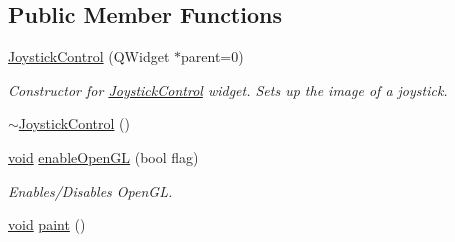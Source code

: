 \subsection*{Public Member Functions}
\begin{DoxyCompactItemize}
\item 
\hyperlink{group___g_c_s_control_gadget_plugin_ga77373f65ad7f3da249f63ebd5d64a736}{Joystick\-Control} (Q\-Widget $\ast$parent=0)
\begin{DoxyCompactList}\small\item\em Constructor for \hyperlink{class_joystick_control}{Joystick\-Control} widget. Sets up the image of a joystick. \end{DoxyCompactList}\item 
\hyperlink{group___g_c_s_control_gadget_plugin_gafb2a1d3ac608e7378bba52d774b825d0}{$\sim$\-Joystick\-Control} ()
\item 
\hyperlink{group___u_a_v_objects_plugin_ga444cf2ff3f0ecbe028adce838d373f5c}{void} \hyperlink{group___g_c_s_control_gadget_plugin_ga4737e633732c138c5ad259f7fe0a0e04}{enable\-Open\-G\-L} (bool flag)
\begin{DoxyCompactList}\small\item\em Enables/\-Disables Open\-G\-L. \end{DoxyCompactList}\item 
\hyperlink{group___u_a_v_objects_plugin_ga444cf2ff3f0ecbe028adce838d373f5c}{void} \hyperlink{group___g_c_s_control_gadget_plugin_gaf79331833d41cf9af3b151a0f18663e0}{paint} ()
\end{DoxyCompactItemize}
